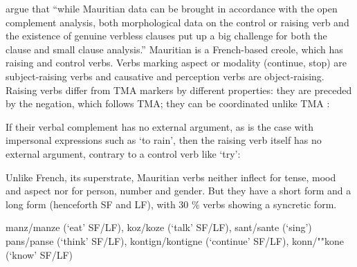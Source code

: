 \documentclass[output=paper]{langsci/langscibook}
\begin{document}
\citet[]{HenriandLaurens2011} argue that ``while Mauritian data can be brought in accordance with the open complement analysis, both morphological data on the control or raising verb and the existence of genuine verbless clauses put up a big challenge for both the clause and small clause analysis.''
Mauritian is a French-based creole, which has raising and control verbs. Verbs marking aspect or
modality (continue, stop) are subject-raising verbs and causative and perception verbs are
object-raising. Raising verbs differ from TMA markers by different properties: they are preceded by
the negation, which follows TMA; they can be coordinated unlike TMA \citep[]{HenriandLaurens2011}:

\eal
{}
\zl
 
If their verbal complement has no external argument, as is the case with impersonal expressions such as  `to rain', then the raising verb itself has no external argument, contrary to a control verb like  `try':

\eal
{}
\zl

Unlike French, its superstrate, Mauritian verbs neither inflect for tense, mood and aspect nor for person, number and
gender. But they have a short form and a long form (henceforth SF and LF), with 30 \% verbs showing a syncretic form.

\begin{exe}
\ex \begin{xlist}
\ex manz/manze (`eat' SF/LF), koz/koze (`talk' SF/LF), sant/sante (`sing')
\ex pans/panse (`think' SF/LF), kontign/kontigne (`continue' SF/LF), konn/""kone (`know' SF/LF)
\end{xlist}
\end{exe}
\end{document}
